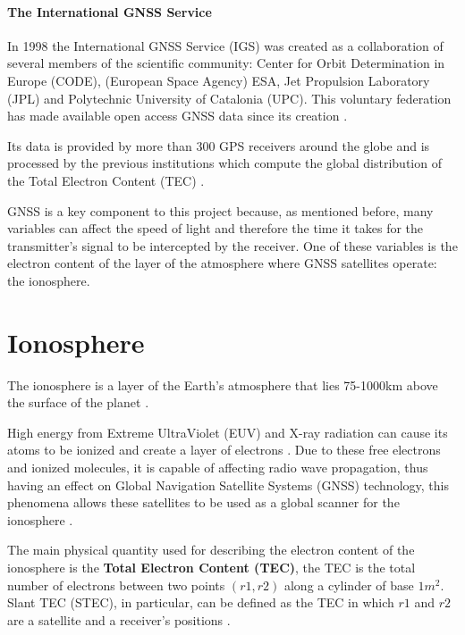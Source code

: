 \paragraph{The International GNSS Service}

In 1998 the International GNSS Service (IGS) was created as a collaboration of several members of the scientific community: Center for Orbit Determination in Europe (CODE), (European Space Agency) ESA, Jet Propulsion Laboratory (JPL) and Polytechnic University of Catalonia (UPC). This voluntary federation has made available open access GNSS data since its creation   \cite{igswebsite} \cite{dow2009international}. 

Its data is provided by more than 300 GPS receivers around the globe and is processed by the previous institutions which compute the global distribution of the Total Electron Content (TEC) \cite{hernandez2009igs}.

GNSS is a key component to this project because, as mentioned before, many variables can affect the speed of light and therefore the time it takes for the transmitter's signal to be intercepted by the receiver. One of these variables is the electron content of the layer of the atmosphere where GNSS satellites operate: the ionosphere.

\section{Ionosphere}

The ionosphere is a layer of the Earth’s atmosphere that lies 75-1000km above the surface of the planet \cite{ionospherestandford}. 

High energy from Extreme UltraViolet (EUV) and X-ray radiation can cause its atoms to be ionized and create a layer of electrons \cite{noaa2ionosphere}. Due to these free electrons and ionized molecules, it is capable of affecting radio wave propagation, thus having an effect on Global Navigation Satellite Systems (GNSS) technology, this phenomena allows these satellites to be used as a global scanner for the ionosphere \cite{hernandez2011ionosphere}. 

The main physical quantity used for describing the electron content of the ionosphere is the \textbf{Total Electron Content (TEC)}, the TEC is the total number of electrons between two points $(r1,r2)$ along a cylinder of base $1m^2$. 
Slant TEC (STEC), in particular, can be defined as the TEC in which $r1$ and $r2$ are a satellite and a receiver’s positions \cite{singh2015gps}. 

